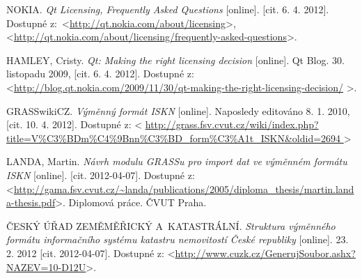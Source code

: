 \documentclass[a4paper,10pt]{article}
\begin{document}
\begin{thebibliography}{9}

NOKIA. \textit{Qt Licensing, Frequently Asked Questions} [online]. [cit. 6. 4. 2012].
Dostupné z:~\textless\url{http://qt.nokia.com/about/licensing}\textgreater, \textless\url{http://qt.nokia.com/about/licensing/frequently-asked-questions}\textgreater.

HAMLEY, Cristy. \textit{Qt: Making the right licensing decision} [online]. Qt Blog. 30. listopadu 2009, [cit. 6. 4. 2012]. Dostupné z: \textless\url{http://blog.qt.nokia.com/2009/11/30/qt-making-the-right-licensing-decision/} \textgreater.

GRASSwikiCZ. \textit{Výměnný formát ISKN} [online].
Naposledy editováno 8. 1. 2010, [cit. 10. 4. 2012]. Dostupné z: \textless
\url{
    http://grass.fsv.cvut.cz/wiki/index.php?title=V%
    } \textgreater

LANDA, Martin. \emph{Návrh modulu GRASSu pro import dat ve výměnném formátu ISKN} [online]. [cit. 2012-04-07]. Dostupné z: \textless\url{http://gama.fsv.cvut.cz/~landa/publications/2005/diploma_thesis/martin.landa-thesis.pdf}\textgreater. Diplomová práce. ČVUT Praha.

ČESKÝ ÚŘAD ZEMĚMĚŘICKÝ A~KATASTRÁLNÍ. \emph{Struktura výměnného formátu informačního systému katastru nemovitostí České republiky} [online]. 23. 2. 2012 [cit. 2012-04-07]. Dostupné z: \textless\url{http://www.cuzk.cz/GenerujSoubor.ashx?NAZEV=10-D12U}\textgreater.
    
    \end{thebibliography}
\end{document}
